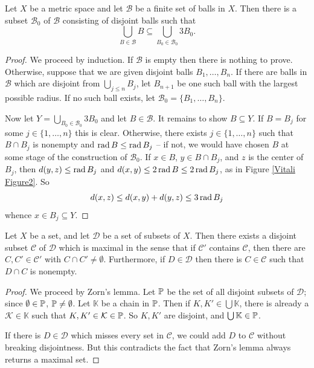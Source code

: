 \begin{theorem}\label{finite Vitali problem}
Let $X$ be a metric space and let $\mathcal B$ be a finite set of balls in $X$. Then there is a subset $\mathcal B_{0}$ of $\mathcal B$ consisting of disjoint balls such that
\[\bigcup_{B \in \mathcal B} B \subseteq \bigcup_{B_{0} \in \mathcal B_{0}} 3B_{0}.\]
\end{theorem}
\begin{proof}
We proceed by induction.
If $\mathcal B$ is empty then there is nothing to prove.
Otherwise, suppose that we are given disjoint balls $B_1, \dots, B_n$.
If there are balls in $\mathcal B$ which are disjoint from $\bigcup_{j \leq n} B_j$, let $B_{n+1}$ be one such ball with the largest possible radius.
If no such ball exists, let $\mathcal B_0 = \{B_1, \dots, B_n\}$.

Now let $Y = \bigcup_{B_{0} \in \mathcal B_{0}} 3B_{0}$ and let $B \in \mathcal B$.
It remains to show $B \subseteq Y$. If $B = B_j$ for some $j \in \{1, \dots, n\}$ this is clear.
Otherwise, there exists $j \in \{1, \dots, n\}$ such that $B \cap B_j$ is nonempty and $\operatorname{rad} B \leq \operatorname{rad} B_j$ -- if not, we would have chosen $B$ at some stage of the construction of $\mathcal B_{0}$.
If $x \in B$, $y \in B \cap B_j$, and $z$ is the center of $B_j$, then $d(y, z) \leq \operatorname{rad} B_j$ and $d(x, y) \leq 2\operatorname{rad} B \leq 2\operatorname{rad} B_j$, as in Figure \ref{Vitali Figure2}.
So
\[d(x, z) \leq d(x, y) + d(y, z) \leq 3 \operatorname{rad} B_j\]
whence $x \in B_j \subseteq Y$.
\end{proof}

\begin{lemma}
Let $X$ be a set, and let $\mathcal D$ be a set of subsets of $X$.
Then there exists a disjoint subset $\mathcal C$ of $\mathcal D$ which is maximal in the sense that if $\mathcal C'$ contains $\mathcal C$, then there are $C,C' \in \mathcal C'$ with $C \cap C' \neq \emptyset$.
Furthermore, if $D \in \mathcal D$ then there is $C \in \mathcal C$ such that $D \cap C$ is nonempty.
\end{lemma}
\begin{proof}
We proceed by Zorn's lemma.
Let $\mathbb{P}$ be the set of all disjoint subsets of $\mathcal D$; since $\emptyset \in \mathbb{P}$, $\mathbb{P} \neq \emptyset$.
Let $\mathbb K$ be a chain in $\mathbb{P}$.
Then if $K, K' \in \bigcup \mathbb K$, there is already a $\mathcal K \in \mathbb K$ such that $K, K' \in \mathcal K \in \mathbb{P}$.
So $K,K'$ are disjoint, and $\bigcup \mathbb K \in \mathbb{P}$.

If there is $D \in \mathcal D$ which misses every set in $\mathcal C$, we could add $D$ to $\mathcal C$ without breaking disjointness.
But this contradicts the fact that Zorn's lemma always returns a maximal set.
\end{proof}


